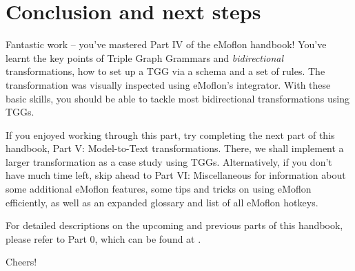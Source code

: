 \section{Conclusion and next steps}
\genHeader

\vspace{0.5cm}

Fantastic work -- you've mastered Part IV of the eMoflon handbook! You've learnt the key points of Triple Graph Grammars and \emph{bidirectional}
transformations, how to set up a TGG via a schema and a set of rules. The transformation was visually inspected using eMoflon's integrator. With these basic
skills, you should be able to tackle most bidirectional transformations using TGGs.

If you enjoyed working through this part, try completing the next part of this handbook, Part V: Model-to-Text transformations. There, we shall implement a
larger transformation as a case study using TGGs. Alternatively, if you don't have much time left, skip ahead to Part VI: Miscellaneous for information about
some additional eMoflon features, some tips and tricks on using eMoflon efficiently, as well as an expanded glossary and list of all eMoflon hotkeys.

For detailed descriptions on the upcoming and previous parts of this handbook, please refer to Part 0, which can be found at \dlPartZero.

Cheers!
